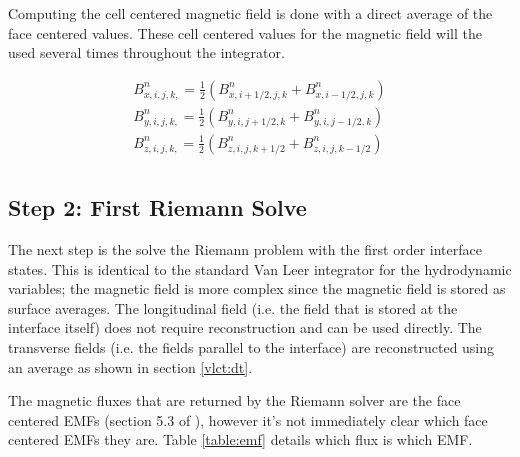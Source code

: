 Computing the cell centered magnetic field is done with a direct average of the face centered values. These cell centered values for the magnetic field will the used several times throughout the integrator.

$$
    \begin{aligned}
        B^n_{x,i,j,k,} = \frac{1}{2} \left( B^n_{x,i+1/2,j,k} + B^n_{x,i-1/2,j,k} \right) \\
        B^n_{y,i,j,k,} = \frac{1}{2} \left( B^n_{y,i,j+1/2,k} + B^n_{y,i,j-1/2,k} \right) \\
        B^n_{z,i,j,k,} = \frac{1}{2} \left( B^n_{z,i,j,k+1/2} + B^n_{z,i,j,k-1/2} \right) \\
    \end{aligned}
$$

\subsection{Step 2: First Riemann Solve}
\label{vlct:first-riemann-solve}

The next step is the solve the Riemann problem with the first order interface states. This is identical to the standard Van Leer integrator for the hydrodynamic variables; the magnetic field is more complex since the magnetic field is stored as surface averages. The longitudinal field (i.e. the field that is stored at the interface itself) does not require reconstruction and can be used directly. The transverse fields (i.e. the fields parallel to the interface) are reconstructed using an average as shown in section \ref{vlct:dt}.

The magnetic fluxes that are returned by the Riemann solver are the face centered EMFs (section 5.3 of \cite{stone_athena_2008}), however it's not immediately clear which face centered EMFs they are. Table \ref{table:emf} details which flux is which EMF.

